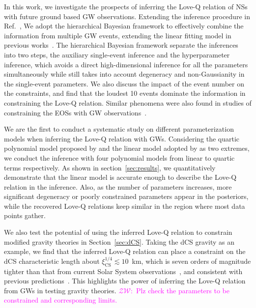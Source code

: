 \documentclass[a4paper,11pt]{article}
\newcommand{\ZW}[1]{\textcolor{magenta}{$\mathcal{ZW}$:~#1}}
\begin{document}
In this work, we investigate the prospects of inferring the Love-Q relation of NSs
with future ground based GW observations.
Extending the inference procedure in
Ref.~\cite{Samajdar:2020xrd}, 
We adopt the hierarchical Bayesian framework to effectively combine the
information from multiple GW events, extending the linear fitting model in
previous works~\cite{Samajdar:2020xrd}. The hierarchical Bayesian framework
separate the inferences into two steps, the auxiliary single-event
inference and the hyperparameter inference, which avoids a direct high-dimensional
inference for all the parameters simultaneously while still takes into account
degeneracy and non-Gaussianity in the single-event parameters. We also discuss
the impact of the event number on the constraints, and find that the loudest 10 events
dominate the information in constraining the Love-Q relation. Similar phenomena
were also found in studies of constraining the EOSs with GW observations~\cite{Lackey:2014fwa,Landry:2020vaw,Pang:2020ilf,Finstad:2022oni,Bandopadhyay:2024zrr,Wang:2024xon}.

We are the first to conduct a systematic study on different parameterization models
when inferring the Love-Q relation with GWs. Considering the quartic polynomial
model proposed by \citet{Yagi:2013awa} and the linear model adopted by
\citet{Samajdar:2020xrd} as two extremes, we conduct the inference with
four polynomial models
from linear to quartic terms respectively. As shown in 
section~\ref{sec:results}, we quantitatively demonstrate that 
the linear model is accurate enough to describe the Love-Q relation in the 
inference. Also, as the number of parameters increases, more significant 
degeneracy or poorly constrained parameters appear in the posteriors, while the recovered Love-Q relations keep similar in the region where most data points gather.

We also test the potential of using the inferred Love-Q relation to
constrain modified gravity theories in Section~\ref{sec:dCS}.
Taking the dCS gravity as an example, we find that the inferred Love-Q relation
can place a constraint on the dCS characteristic length about
$\xi_{\mathrm{CS}}^{1/4} \lesssim 10$~km, which is seven orders
of magnitude tighter than that from current Solar System
observations~\cite{Ali-Haimoud:2011zme,Yagi:2012ya}, and consistent with
previous predictions~\cite{Yagi:2013bca,Yagi:2013awa}. This highlights the power
of inferring the Love-Q relation from GWs in testing gravity theories. \ZW{Plz
check the parameters to be constrained and corresponding limits.}
\end{document}
